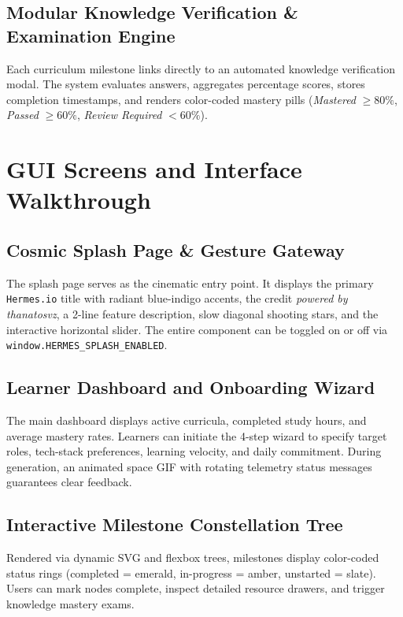 \documentclass[12pt,a4paper]{article}
\begin{document}
\subsection{Modular Knowledge Verification \& Examination Engine}
Each curriculum milestone links directly to an automated knowledge verification modal. The system evaluates answers, aggregates percentage scores, stores completion timestamps, and renders color-coded mastery pills (\textit{Mastered} $\ge 80\%$, \textit{Passed} $\ge 60\%$, \textit{Review Required} $< 60\%$).

\newpage

\section{GUI Screens and Interface Walkthrough}

\subsection{Cosmic Splash Page \& Gesture Gateway}
The splash page serves as the cinematic entry point. It displays the primary \texttt{Hermes.io} title with radiant blue-indigo accents, the credit \textit{powered by thanatosvz}, a 2-line feature description, slow diagonal shooting stars, and the interactive horizontal slider. The entire component can be toggled on or off via \texttt{window.HERMES\_SPLASH\_ENABLED}.

\subsection{Learner Dashboard and Onboarding Wizard}
The main dashboard displays active curricula, completed study hours, and average mastery rates. Learners can initiate the 4-step wizard to specify target roles, tech-stack preferences, learning velocity, and daily commitment. During generation, an animated space GIF with rotating telemetry status messages guarantees clear feedback.

\subsection{Interactive Milestone Constellation Tree}
Rendered via dynamic SVG and flexbox trees, milestones display color-coded status rings (completed = emerald, in-progress = amber, unstarted = slate). Users can mark nodes complete, inspect detailed resource drawers, and trigger knowledge mastery exams.
\end{document}

